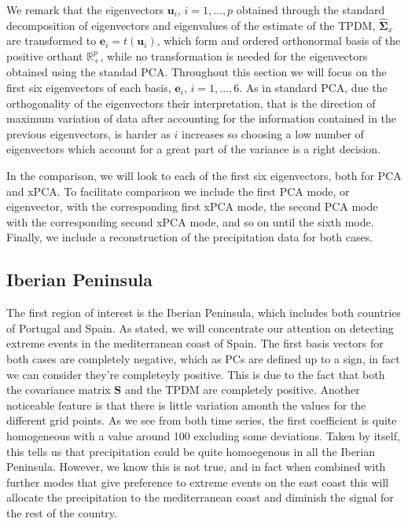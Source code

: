 \documentclass[11pt, oneside]{book}
\theoremstyle{plain}
\theoremstyle{remark}
\newcommand*{\mbf}[1]{\mathbf{#1}}
\begin{document}
We remark that the eigenvectors $\mbf{u}_i$, $i=1,\dots,p$ obtained through the
standard decomposition of eigenvectors and eigenvalues of the estimate of the
TPDM, $\hat{\mbf{\Sigma}}_x$ are transformed to $\mbf{e}_i = t(\mbf{u}_i)$,
which form and ordered orthonormal basis of the positive orthant
$\mathbb{R}^p_+$, while no transformation is needed for the eigenvectors
obtained using the standad PCA. Throughout this section we will focus on the
first six eigenvectors of each basis, $\mbf{e}_i$, $i=1,\dots,6$. As in standard
PCA, due the orthogonality of the eigenvectors their interpretation, that is the
direction of maximum variation of data after accounting for the information
contained in the previous eigenvectors, is harder as $i$ increases so choosing a
low number of eigenvectors which account for a great part of the variance is a
right decision.

In the comparison, we will look to each of the first six eigenvectors, both for
PCA and xPCA. To facilitate comparison we include the first PCA mode, or
eigenvector, with the corresponding first xPCA mode, the second PCA mode with
the corresponding second xPCA mode, and so on until the sixth mode. Finally, we
include a reconstruction of the precipitation data for both cases.

\subsection{Iberian Peninsula}
The first region of interest is the Iberian Peninsula, which includes both
countries of Portugal and Spain. As stated, we will concentrate our attention on
detecting extreme events in the mediterranean coast of Spain. The first basis
vectors for both cases are completely negative, which as PCs are defined up to a
sign, in fact we can consider they're completeyly positive. This is due to the
fact that both the covariance matrix $\mbf{S}$ and the TPDM are completely
positive. Another noticeable feature is that there is little variation amonth
the values for the different grid points. As we see from both time series, the
first coefficient is quite homogeneous with a value around 100 excluding some
deviations. Taken by itself, this tells us that precipitation could be quite
homoegenous in all the Iberian Peninsula. However, we know this is not true, and
in fact when combined with further modes that give preference to extreme events
on the east coast this will allocate the precipitation to the mediterranean
coast and diminish the signal for the rest of the country. 
\end{document}

